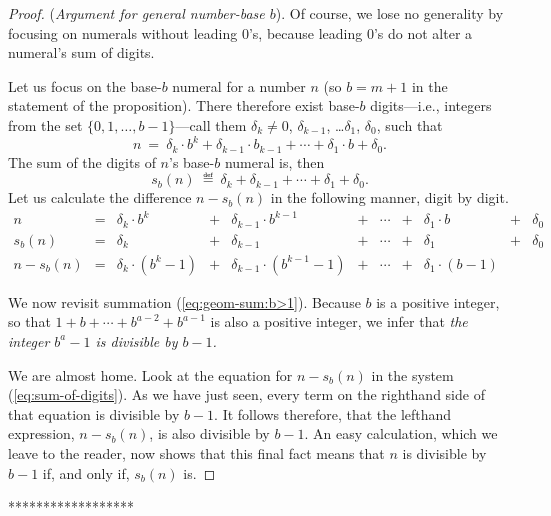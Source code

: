 {\smallskip

\begin{proof}
({\it Argument for general number-base $b$}).
%
Of course, we lose no generality by focusing on numerals without
leading $0$'s, because leading $0$'s do not alter a numeral's sum of
digits.

Let us focus on the base-$b$ numeral for a number $n$ (so $b = m+1$ in
the statement of the proposition).  There therefore exist base-$b$
digits---i.e., integers from the set $\{0, 1, \ldots, b-1\}$---call
them $\delta_k \neq 0$, $\delta_{k-1}$, \ldots $\delta_1$, $\delta_0$,
such that
\[ n \ = \ \delta_k \cdot b^k + \delta_{k-1} \cdot b_{k-1} + \cdots +
\delta_1 \cdot b + \delta_0. \]
The sum of the digits of $n$'s base-$b$ numeral is, then
\[ s_b(n) \ \eqdef \ \delta_k + \delta_{k-1} + \cdots + \delta_1 +
\delta_0. \]
Let us calculate the difference $n - s_b(n)$ in the following manner,
digit by digit.
\begin{equation}
\label{eq:sum-of-digits}
\begin{array}{ccccccccccc}
n & = &
\delta_k \cdot b^k & + & \delta_{k-1} \cdot b^{k-1} & + & \cdots
  & + & \delta_1 \cdot b & + & \delta_0 \\
s_b(n) & = &
\delta_k & + & \delta_{k-1} & + & \cdots & + & \delta_1 & + & \delta_0 \\
\hline
n - s_b(n) & = &
\delta_k \cdot (b^k -1) & + &
\delta_{k-1} \cdot (b^{k-1} -1) & + &
\cdots & + &
\delta_1 \cdot (b-1) & & 
\end{array}
\end{equation}

\medskip

We now revisit summation (\ref{eq:geom-sum:b>1}).  Because $b$ is a
positive integer, so that $1 + b + \cdots + b^{a-2} + b^{a-1}$ is also
a positive integer, we infer that {\em the integer $b^a -1$ is
  divisible by $b-1$.}

We are almost home.  Look at the equation for $n - s_b(n)$ in the
system (\ref{eq:sum-of-digits}).  As we have just seen, every term on
the righthand side of that equation is divisible by $b-1$.  It follows
therefore, that the lefthand expression, $n - s_b(n)$, is also
divisible by $b-1$.
An easy calculation, which we leave to the reader, now shows that this
final fact means that $n$ is divisible by $b-1$ if, and only if,
$s_b(n)$ is.
\end{proof}


******************}



